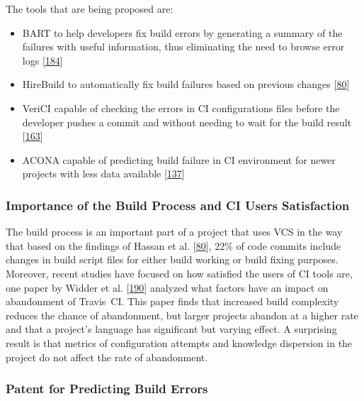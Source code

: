 \documentclass[]{book}
\providecommand{\tightlist}{%
  \setlength{\itemsep}{0pt}\setlength{\parskip}{0pt}}
\begin{document}
The tools that are being proposed are:

\begin{itemize}
\tightlist
\item
  BART to help developers fix build errors by generating a summary of
  the failures with useful information, thus eliminating the need to
  browse error logs {[}\protect\hyperlink{ref-vassallo2018break}{184}{]}
\item
  HireBuild to automatically fix build failures based on previous
  changes {[}\protect\hyperlink{ref-hassan2018hirebuild}{80}{]}
\item
  VeriCI capable of checking the errors in CI configurations files
  before the developer pushes a commit and without needing to wait for
  the build result
  {[}\protect\hyperlink{ref-santolucito2018statically}{163}{]}
\item
  ACONA capable of predicting build failure in CI environment for newer
  projects with less data available
  {[}\protect\hyperlink{ref-ni2018acona}{137}{]}
\end{itemize}

\subsubsection{Importance of the Build Process and CI Users
Satisfaction}\label{importance-of-the-build-process-and-ci-users-satisfaction}

The build process is an important part of a project that uses VCS in the
way that based on the findings of Hassan et al.
{[}\protect\hyperlink{ref-hassan2018hirebuild}{80}{]}, 22\% of code
commits include changes in build script files for either build working
or build fixing purposes. Moreover, recent studies have focused on how
satisfied the users of CI tools are, one paper by Widder et al.
{[}\protect\hyperlink{ref-widder2018m}{190}{]} analyzed what factors
have an impact on abandonment of Travis~CI. This paper finds that
increased build complexity reduces the chance of abandonment, but larger
projects abandon at a higher rate and that a project's language has
significant but varying effect. A surprising result is that metrics of
configuration attempts and knowledge dispersion in the project do not
affect the rate of abandonment.

\subsubsection{Patent for Predicting Build
Errors}\label{patent-for-predicting-build-errors}
\end{document}
